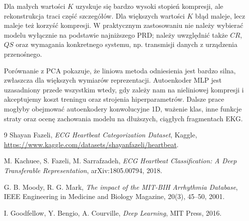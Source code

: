 \documentclass[12pt,a4paper]{article}
\begin{document}
Dla małych wartości $K$ uzyskuje się bardzo wysoki stopień kompresji, ale rekonstrukcja traci część szczegółów. Dla większych wartości $K$ błąd maleje, lecz maleje też korzyść kompresji. W praktycznym zastosowaniu nie należy wybierać modelu wyłącznie na podstawie najniższego PRD; należy uwzględnić także $CR$, $QS$ oraz wymagania konkretnego systemu, np. transmisji danych z urządzenia przenośnego.

Porównanie z PCA pokazuje, że liniowa metoda odniesienia jest bardzo silna, zwłaszcza dla większych wymiarów reprezentacji. Autoenkoder MLP jest uzasadniony przede wszystkim wtedy, gdy zależy nam na nieliniowej kompresji i akceptujemy koszt treningu oraz strojenia hiperparametrów. Dalsze prace mogłyby obejmować autoenkodery konwolucyjne 1D, ważenie klas, inne funkcje straty oraz ocenę zachowania modelu na dłuższych, ciągłych fragmentach EKG.

\begin{thebibliography}{9}
Shayan Fazeli, \textit{ECG Heartbeat Categorization Dataset}, Kaggle, \url{https://www.kaggle.com/datasets/shayanfazeli/heartbeat}.

M. Kachuee, S. Fazeli, M. Sarrafzadeh, \textit{ECG Heartbeat Classification: A Deep Transferable Representation}, arXiv:1805.00794, 2018.

G. B. Moody, R. G. Mark, \textit{The impact of the MIT-BIH Arrhythmia Database}, IEEE Engineering in Medicine and Biology Magazine, 20(3), 45--50, 2001.

I. Goodfellow, Y. Bengio, A. Courville, \textit{Deep Learning}, MIT Press, 2016.
\end{thebibliography}
\end{document}
